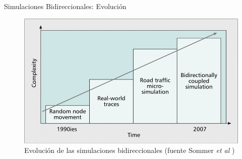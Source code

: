 \documentclass[aspectratio=169]{beamer}
\begin{document}
\begin{frame}{Simulaciones Bidireccionales: Evolución}
\begin{figure}
    \centering
    \includegraphics[width=.7\linewidth]{figuras/evolution_bidirectional_sim_sommerdressler.png}
    \caption{Evolución de las simulaciones bidireccionales (fuente Sommer \emph{et al} \autocite{sommer_dressler2})}
\end{figure}

\end{frame}
\end{document}

